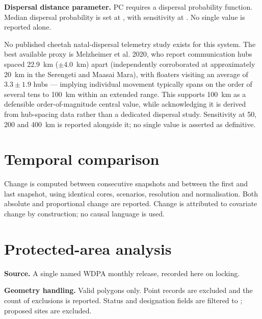 \textbf{Dispersal distance parameter.} PC requires a dispersal probability
function. Median dispersal probability is set at ,
with sensitivity at . No single value
is reported alone.

No published cheetah natal-dispersal telemetry study exists for this system.
The best available proxy is Melzheimer et al. 2020, who report communication
hubs spaced \SI{22.9}{\kilo\metre} ($\pm$\SI{4.0}{\kilo\metre}) apart (independently corroborated at
approximately \SI{20}{\kilo\metre} in the Serengeti and Maasai Mara), with
floaters visiting an average of $3.3 \pm 1.9$ hubs --- implying individual
movement typically spans on the order of several tens to \SI{100}{\kilo\metre}
within an extended range. This supports \SI{100}{\kilo\metre} as a defensible
order-of-magnitude central value, while acknowledging it is derived from
hub-spacing data rather than a dedicated dispersal study. Sensitivity at 50,
200 and \SI{400}{\kilo\metre} is reported alongside it; no single value is
asserted as definitive.

\section{Temporal comparison}

Change is computed between consecutive snapshots and between the first and last
snapshot, using identical cores, scenarios, resolution and normalisation. Both
absolute and proportional change are reported. Change is attributed to covariate
change by construction; no causal language is used.

\section{Protected-area analysis}
\label{sec:pa}

\textbf{Source.} A single named WDPA monthly release, recorded here on locking.

\textbf{Geometry handling.} Valid polygons only. Point records are excluded and
the count of exclusions is reported. Status and designation fields are filtered
to ; proposed sites are excluded.

